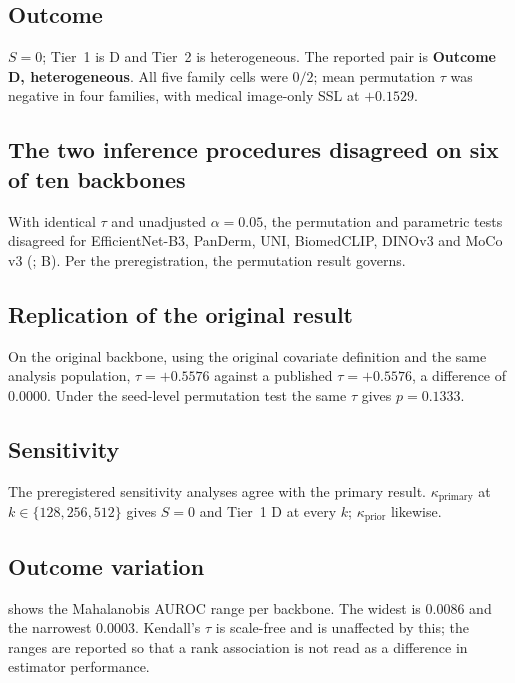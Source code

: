 \documentclass[11pt,a4paper]{article}
\newcommand{\kprim}{\ensuremath{\kappa_{\mathrm{primary}}}}
\newcommand{\kpfour}{\ensuremath{\kappa_{\mathrm{prior}}}}
\begin{document}
\subsection{Outcome}

$S = 0$; Tier~1 is D and Tier~2 is heterogeneous. The reported pair is
\textbf{Outcome D, heterogeneous}. All five family cells were $0/2$; mean
permutation $\tau$ was negative in four families, with medical image-only SSL at
$+0.1529$.

\subsection{The two inference procedures disagreed on six of ten backbones}

With identical $\tau$ and unadjusted $\alpha = 0.05$, the permutation and
parametric tests disagreed for EfficientNet-B3, PanDerm, UNI, BiomedCLIP, DINOv3
and MoCo\,v3 (; B). Per the preregistration, the
permutation result governs.

\subsection{Replication of the original result}

On the original backbone, using the original covariate definition and the same
analysis population, $\tau = +0.5576$ against a published $\tau = +0.5576$, a
difference of $0.0000$. Under the seed-level permutation test the same $\tau$
gives $p = 0.1333$.

\subsection{Sensitivity}

The preregistered sensitivity analyses agree with the primary result. \kprim{} at
$k \in \{128, 256, 512\}$ gives $S = 0$ and Tier~1 D at every $k$; \kpfour{}
likewise.

\subsection{Outcome variation}

 shows the Mahalanobis AUROC range per backbone. The widest is
$0.0086$ and the narrowest $0.0003$. Kendall's $\tau$ is scale-free and is
unaffected by this; the ranges are reported so that a rank association is not
read as a difference in estimator performance.
\end{document}
